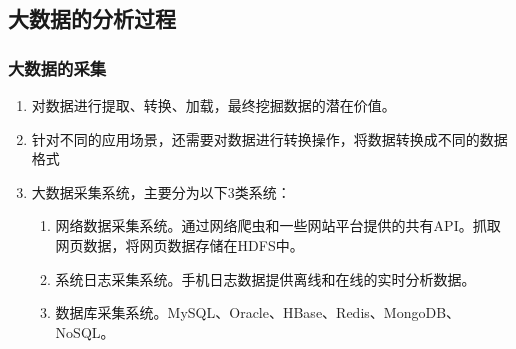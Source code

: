 \documentclass{article}
\begin{document}
\subsection{大数据的分析过程}
\subsubsection{大数据的采集}
\begin{enumerate}
    \item 对数据进行提取、转换、加载，最终挖掘数据的潜在价值。
    \item 针对不同的应用场景，还需要对数据进行转换操作，将数据转换成不同的数据格式
    \item 大数据采集系统，主要分为以下3类系统：
          \begin{enumerate}
              \item 网络数据采集系统。通过网络爬虫和一些网站平台提供的共有API。抓取网页数据，将网页数据存储在HDFS中。
              \item 系统日志采集系统。手机日志数据提供离线和在线的实时分析数据。
              \item 数据库采集系统。MySQL、Oracle、HBase、Redis、MongoDB、NoSQL。
          \end{enumerate}
\end{enumerate}
\end{document}
